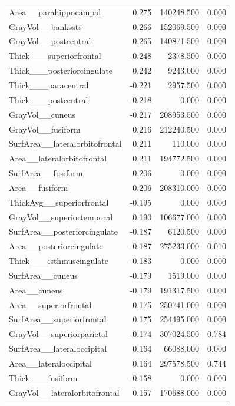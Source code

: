 \documentclass{article}
\begin{document}
\begin{longtable}{lrrr}
	Area\_\_parahippocampal & 0.275 & 140248.500 & 0.000 \\
	GrayVol\_\_bankssts & 0.266 & 152069.500 & 0.000 \\
	GrayVol\_\_postcentral & 0.265 & 140871.500 & 0.000 \\
	Thick\_\_\_superiorfrontal & -0.248 & 2378.500 & 0.000 \\
	Thick\_\_\_posteriorcingulate & 0.242 & 9243.000 & 0.000 \\
	Thick\_\_\_paracentral & -0.221 & 2957.500 & 0.000 \\
	Thick\_\_\_postcentral & -0.218 & 0.000 & 0.000 \\
	GrayVol\_\_cuneus & -0.217 & 208953.500 & 0.000 \\
	GrayVol\_\_fusiform & 0.216 & 212240.500 & 0.000 \\
	SurfArea\_\_lateralorbitofrontal & 0.211 & 110.000 & 0.000 \\
	Area\_\_lateralorbitofrontal & 0.211 & 194772.500 & 0.000 \\
	SurfArea\_\_fusiform & 0.206 & 0.000 & 0.000 \\
	Area\_\_fusiform & 0.206 & 208310.000 & 0.000 \\
	ThickAvg\_\_superiorfrontal & -0.195 & 0.000 & 0.000 \\
	GrayVol\_\_superiortemporal & 0.190 & 106677.000 & 0.000 \\
	SurfArea\_\_posteriorcingulate & -0.187 & 6120.500 & 0.000 \\
	Area\_\_posteriorcingulate & -0.187 & 275233.000 & 0.010 \\
	Thick\_\_\_isthmuscingulate & -0.183 & 0.000 & 0.000 \\
	SurfArea\_\_cuneus & -0.179 & 1519.000 & 0.000 \\
	Area\_\_cuneus & -0.179 & 191317.500 & 0.000 \\
	Area\_\_superiorfrontal & 0.175 & 250741.000 & 0.000 \\
	SurfArea\_\_superiorfrontal & 0.175 & 254495.000 & 0.000 \\
	GrayVol\_\_superiorparietal & -0.174 & 307024.500 & 0.784 \\
	SurfArea\_\_lateraloccipital & 0.164 & 66088.000 & 0.000 \\
	Area\_\_lateraloccipital & 0.164 & 297578.500 & 0.744 \\
	Thick\_\_\_fusiform & -0.158 & 0.000 & 0.000 \\
	GrayVol\_\_lateralorbitofrontal & 0.157 & 170688.000 & 0.000 \\

\end{longtable}
\end{document}
